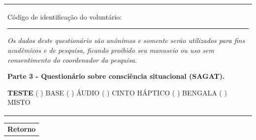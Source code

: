 %
\begin{table}[!htb]
    \centering
    \begin{tabular}{m{1\linewidth}}

        {\color{gray}
        
        Código de identificação do voluntário: \rule{1in}{.2mm}
        
        \textit{Os dados deste questionário são anônimos e somente serão utilizados para fins acadêmicos e de pesquisa, ficando proibido seu manuseio ou uso sem consentimento do coordenador da pesquisa.}
        }
        
        \begin{center}
        \textbf{Parte 3 - Questionário sobre consciência situacional (SAGAT).}
        \end{center}
        
        \noindent
        \textbf{TESTE} ( ) BASE \hfill ( ) ÁUDIO \hfill ( ) CINTO HÁPTICO \hfill ( ) BENGALA \hfill ( ) MISTO
        
    \end{tabular}

    \centering
    \begin{tabular}{m{1\linewidth}}
        \textbf{Retorno}
    \end{tabular}

\hspace{0.5cm}

%


\end{table}
